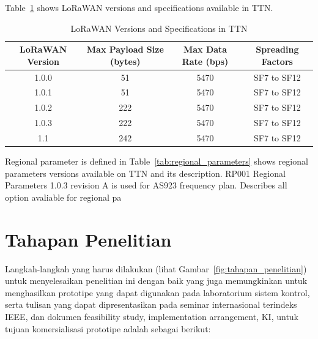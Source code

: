 Table~\ref{tab:lorawan_specifications} shows LoRaWAN versions and specifications available in TTN.
\begin{table}[htbp]
    \centering
    \caption{LoRaWAN Versions and Specifications in TTN}
    \label{tab:lorawan_specifications}
    \begin{tabular}{|c|c|c|c|}
        \hline
        \textbf{LoRaWAN Version} & \textbf{Max Payload Size (bytes)} & \textbf{Max Data Rate (bps)} & \textbf{Spreading Factors} \\ \hline
        1.0.0                    & 51                                & 5470                         & SF7 to SF12                \\ \hline
        1.0.1                    & 51                                & 5470                         & SF7 to SF12                \\ \hline
        1.0.2                    & 222                               & 5470                         & SF7 to SF12                \\ \hline
        1.0.3                    & 222                               & 5470                         & SF7 to SF12                \\ \hline
        1.1                      & 242                               & 5470                         & SF7 to SF12                \\ \hline
    \end{tabular}
\end{table}

Regional parameter is defined in Table~\ref{tab:regional_parameters} shows regional parameters versions available on TTN and its description.
RP001 Regional Parameters 1.0.3 revision A is used for AS923 frequency plan.
Describes all option avaliable for regional pa




\section{Tahapan Penelitian}
Langkah-langkah yang harus dilakukan (lihat Gambar~\ref{fig:tahapan_penelitian}) untuk menyelesaikan penelitian ini dengan baik yang juga memungkinkan untuk menghasilkan prototipe yang dapat digunakan pada laboratorium sistem kontrol, serta tulisan yang dapat dipresentasikan pada seminar internasional terindeks IEEE, dan dokumen feasibility study, implementation arrangement, KI, untuk tujuan komersialisasi prototipe adalah sebagai berikut:

